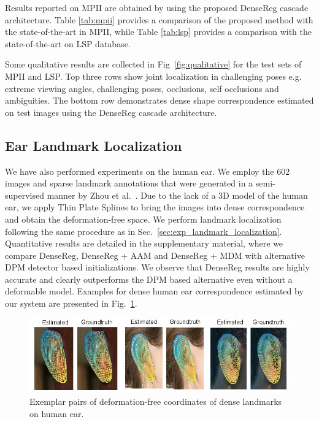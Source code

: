 Results reported on MPII are obtained by using the proposed DenseReg cascade architecture. Table \ref{tab:mpii} provides a comparison of the proposed method with the state-of-the-art in MPII, while Table \ref{tab:lsp} provides a comparison with the state-of-the-art on LSP database.

Some qualitative results are collected in Fig~\ref{fig:qualitative} for the test sets of MPII and LSP. Top three rows show joint localization in challenging poses e.g. extreme viewing angles, challenging poses, occlusions, self occlusions and ambiguities. The bottom row demonstrates dense shape correspondence estimated on test images using the DenseReg cascade architecture.

 
\subsection{Ear Landmark Localization}
\label{sec:exp_ear}

We have also performed experiments on the human ear. We employ the $602$ images and sparse landmark annotations that were generated in a semi-supervised manner by Zhou et al.~\citep{Zhou_2016_CVPR}. Due to the lack of a 3D model of the human ear, we apply Thin Plate Splines to bring the images into dense correspondence and obtain the deformation-free space. We perform landmark localization following the same procedure as in Sec.~\ref{sec:exp_landmark_localization}.
Quantitative results are detailed in the supplementary material, where we compare DenseReg, DenseReg + AAM and DenseReg + MDM with alternative DPM detector based initializations.  We observe that DenseReg results are highly accurate and clearly outperforms the DPM based alternative even without a deformable model. Examples for dense human ear correspondence estimated by our system  are presented in Fig.~\ref{fig:ears_examples}.


\begin{figure}[h]
\centering
\includegraphics[width=\linewidth]{Figures/ears3}
\caption{Exemplar pairs of deformation-free coordinates of dense landmarks on human ear.}
\label{fig:ears_examples}
\end{figure}

